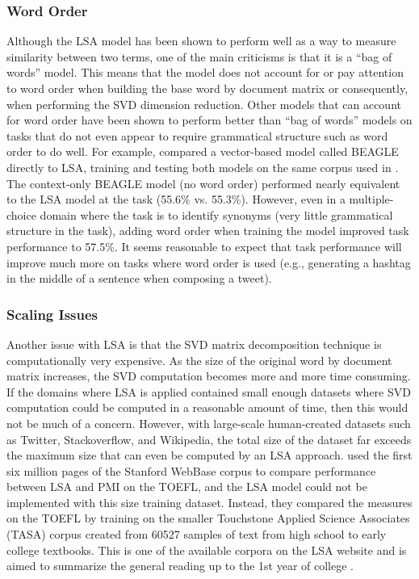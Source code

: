\documentclass[man,floatsintext,donotrepeattitle]{apa6}
\begin{document}
\subsubsection{Word Order}

Although the LSA model has been shown to perform well as a way to measure similarity between two terms, one of the main criticisms is that it is a ``bag of words'' model.
This means that the model does not account for or pay attention to word order when building the base word by document matrix or consequently, when performing the SVD dimension reduction.
Other models that can account for word order have been shown to perform better than ``bag of words'' models on tasks that do not even appear to require grammatical structure such as word order to do well.
For example, \textcite{Jones2007} compared a vector-based model called BEAGLE directly to LSA, training and testing both models on the same corpus used in \textcite{Landauer1997}.
The context-only BEAGLE model (no word order) performed nearly equivalent to the LSA model at the task (55.6\% vs. 55.3\%).
However, even in a multiple-choice domain where the task is to identify synonyms (very little grammatical structure in the task), adding word order when training the model improved task performance to 57.5\%.
It seems reasonable to expect that task performance will improve much more on tasks where word order is used (e.g., generating a hashtag in the middle of a sentence when composing a tweet).

\subsubsection{Scaling Issues}

Another issue with LSA is that the SVD matrix decomposition technique is computationally very expensive.
As the size of the original word by document matrix increases, the SVD computation becomes more and more time consuming.
If the domains where LSA is applied contained small enough datasets where SVD computation could be computed in a reasonable amount of time, then this would not be much of a concern.
However, with large-scale human-created datasets such as Twitter, Stackoverflow, and Wikipedia, the total size of the dataset far exceeds the maximum size that can even be computed by an LSA approach.
\textcite{Budiu2007} used the first six million pages of the Stanford WebBase corpus to compare performance between LSA and PMI on the TOEFL, and the LSA model could not be implemented with this size training dataset.
Instead, they compared the measures on the TOEFL by training on the smaller Touchstone Applied Science Associates (TASA) corpus created from \num{60527} samples of text from high school to early college textbooks.
This is one of the available corpora on the LSA website and is aimed to summarize the general reading up to the 1st year of college \parencite{Budiu2007}.
\end{document}
